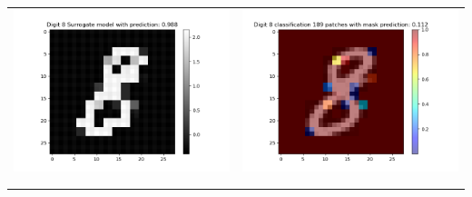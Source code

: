 \documentclass[12pt]{article}
\begin{document}
\begin{table}[H]
\begin{tabular}{|c|c|}
\begin{minipage}{0.45\linewidth}
            \includegraphics[width=\linewidth]{../fig/ID 2-Digit 8 pred 8 new_image.png}
        \end{minipage} &
        \begin{minipage}{0.45\linewidth}
            \centering

            \includegraphics[width=\linewidth]{../fig/ID 2-Digit 8 classification n patches = 189.png}
        \end{minipage} \\
        \\
        \hline
        \begin{minipage}{0.45\linewidth}
            \centering


\end{minipage}
\end{tabular}
\end{table}
\end{document}
